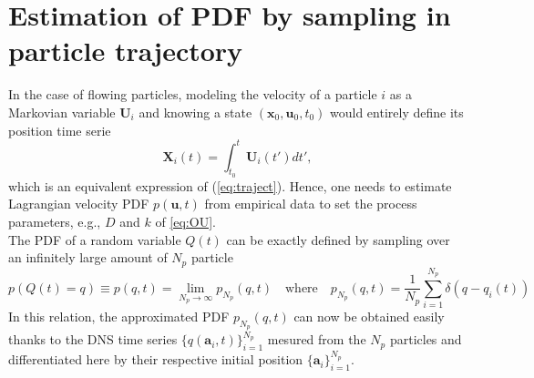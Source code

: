 \section{Estimation of PDF by sampling in particle trajectory}
In the case of flowing particles, modeling the velocity of a particle $i$ as a Markovian variable $\textbf{U}_i$ and knowing a state $(\textbf{x}_0,\textbf{u}_0,t_0)$ would entirely define its position time serie 
\[
\textbf{X}_i(t)=\int_{t_0}^{t}\textbf{U}_i(t')dt',
\]
which is an equivalent expression of (\ref{eq:traject}).
Hence, one needs to estimate Lagrangian velocity PDF $p(\textbf{u},t)$ from empirical data to set the process parameters, e.g., $D$ and $k$ of \eqref{eq:OU}. 
\\The PDF of a random variable $Q(t)$ can be exactly defined by sampling over an infinitely large amount of $N_p$ particle
\[
p(Q(t)=q)\equiv p(q,t)=\lim\limits_{N_p\rightarrow\infty}p_{N_p}(q,t) \quad\textrm{where}\quad p_{N_p}(q,t)=\frac{1}{N_p}\sum_{i=1}^{N_p}\delta(q-q_i(t))
\]
In this relation, the approximated PDF $p_{N_p}(q,t)$ can now be obtained easily thanks to the DNS time series $\{q(\textbf{a}_i,t)\}_{i=1}^{N_p}$ mesured from the $N_p$ particles and differentiated here by their respective initial position $\{\textbf{a}_i\}_{i=1}^{N_p}$.\\


